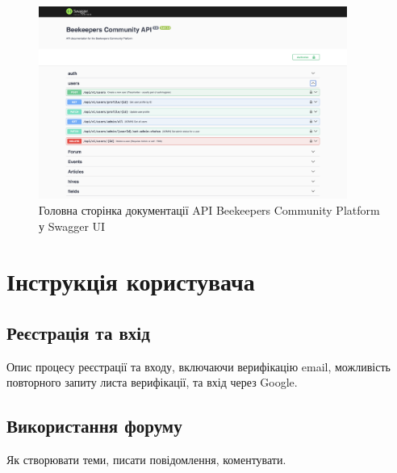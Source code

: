 \begin{figure}[H]
  \centering
  \includegraphics[width=0.9\textwidth]{practice_report/images/swagger.png}
  \caption{Головна сторінка документації API Beekeepers Community Platform у Swagger UI}
  \label{fig:swagger}
\end{figure}

\chapter{Інструкція користувача}
\label{app:user_manual}

\section*{Реєстрація та вхід}
Опис процесу реєстрації та входу, включаючи верифікацію email, можливість повторного запиту листа верифікації, та вхід через Google.

\section*{Використання форуму}
Як створювати теми, писати повідомлення, коментувати.

